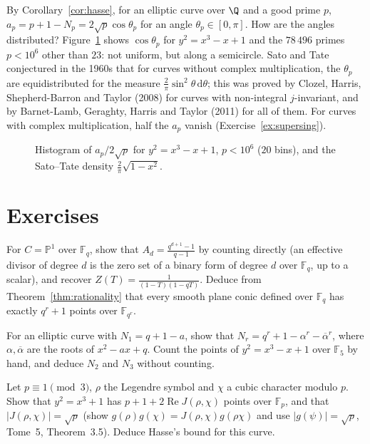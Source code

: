 \begin{remark}
By Corollary~\ref{cor:hasse}, for an elliptic curve over $\Q$ and a good prime $p$, $a_p=p+1-N_p=2\sqrt p\cos\theta_p$ for an angle $\theta_p\in[0,\pi]$. How are
the angles distributed? Figure~\ref{fig:satotate} shows $\cos\theta_p$ for $y^2=x^3-x+1$ and the $78\,496$ primes $p<10^6$ other than $23$: not uniform, but along a
semicircle. Sato and Tate conjectured in the 1960s that for curves without complex multiplication, the $\theta_p$ are equidistributed for the measure
$\frac2\pi\sin^2\theta\,\mathrm d\theta$; this was proved by Clozel, Harris, Shepherd-Barron and Taylor (2008) for curves with non-integral $j$-invariant, and by
Barnet-Lamb, Geraghty, Harris and Taylor (2011) for all of them. For curves with complex multiplication, half the $a_p$ vanish (Exercise~\ref{ex:supersing}).
\end{remark}

\begin{figure}[ht]
\centering{}
\caption{Histogram of $a_p/2\sqrt p$ for $y^2=x^3-x+1$, $p<10^6$ ($20$ bins), and the Sato--Tate density $\frac2\pi\sqrt{1-x^2}$.}
\label{fig:satotate}
\end{figure}

\section{Exercises}

\begin{exercise}[$\star$]\label{ex:zetaP1}
For $C=\mathbb P^1$ over $\mathbb F_q$, show that $A_d=\frac{q^{d+1}-1}{q-1}$ by counting directly (an effective divisor of degree $d$ is the zero set of a binary form of
degree $d$ over $\mathbb F_q$, up to a scalar), and recover $Z(T)=\frac1{(1-T)(1-qT)}$. Deduce from Theorem~\ref{thm:rationality} that every smooth plane conic defined
over $\mathbb F_q$ has exactly $q^r+1$ points over $\mathbb F_{q^r}$.
\end{exercise}

\begin{exercise}[$\star$]\label{ex:ellNr}
For an elliptic curve with $N_1=q+1-a$, show that $N_r=q^r+1-\alpha^r-\overline\alpha^r$, where $\alpha,\overline\alpha$ are the roots of $x^2-ax+q$. Count the points of
$y^2=x^3-x+1$ over $\mathbb F_5$ by hand, and deduce $N_2$ and $N_3$ without counting.
\end{exercise}

\begin{exercise}[$\star\star$]\label{ex:jacobicount}
Let $p\equiv1\pmod3$, $\rho$ the Legendre symbol and $\chi$ a cubic character modulo $p$. Show that $y^2=x^3+1$ has $p+1+2\operatorname{Re}J(\rho,\chi)$ points over
$\mathbb F_p$, and that $|J(\rho,\chi)|=\sqrt p$ (show $g(\rho)g(\chi)=J(\rho,\chi)g(\rho\chi)$ and use $|g(\psi)|=\sqrt p$, Tome~5, Theorem~3.5). Deduce Hasse's bound for this
curve.
\end{exercise}

